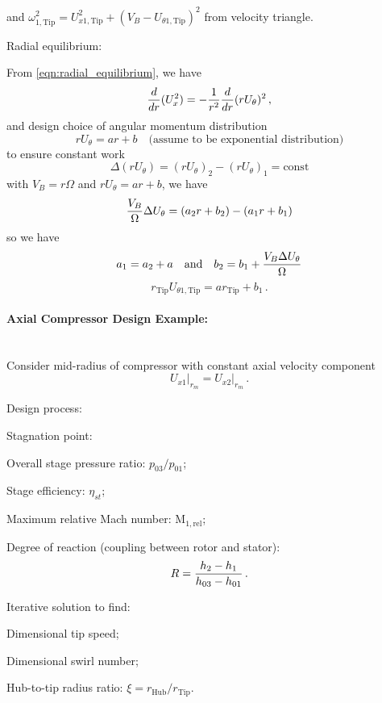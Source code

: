 \begin{enumeratePacked}
\begin{itemizePacked}
\[    \]
    and $\omega_{1,\text{Tip}}^2 = U_{x1,\text{Tip}}^2 + (V_B - U_{\theta1,\text{Tip}})^2$ from velocity triangle.
  \end{itemizePacked}
\item Radial equilibrium:
  \begin{itemizePacked}
  \item From \cref{eqn:radial_equilibrium}, we have
    \[
      {\frac{d}{dr}} (U_x^2) = - {\frac{1}{r^2}} {\frac{d}{dr}} (r U_\theta)^2\,,
    \]
    and design choice of angular momentum distribution
    \[
      r U_\theta = a r + b \quad \text{(assume to be exponential distribution)}
    \]
    to ensure constant work
    \[
      \Delta (r U_\theta) = (r U_\theta)_2 - (r U_\theta)_1 = \text{const}
    \]
    with $V_B = r \Omega$ and $r U_\theta = a r + b$, we have
    \[
      {\frac{V_B}{\Omega}} \Delta U_\theta = (a_2 r + b_2) - (a_1 r + b_1)
    \]
    so we have
    \[
      a_1 = a_2 + a \quad \text{and} \quad b_2 = b_1 + {\frac{V_B \Delta U_\theta}{\Omega}}
    \]
    \[
      r_\text{Tip} U_{\theta1, \text{Tip}} = a r_\text{Tip} + b_1\,.
    \]
  \end{itemizePacked}
\end{enumeratePacked}

\paragraph{Axial Compressor Design Example:}  \mbox{}\\[0.5em]

Consider mid-radius of compressor with constant axial velocity component
\[
  \left.U_{x1}\right|_{r_m} = \left.U_{x2}\right|_{r_m}\,.
\]

Design process:
\begin{itemizePacked}
\item Stagnation point:
  \begin{itemizePacked}
  \item Overall stage pressure ratio: $p_{03}/p_{01}$;
  \item Stage efficiency: $\eta_{st}$;
  \item Maximum relative Mach number: $\text{M}_{1,\text{rel}}$;
  \item Degree of reaction (coupling between rotor and stator):
    \[
      R = {\frac{h_2 - h_1}{h_{03} - h_{01}}} \,.
    \]
  \end{itemizePacked}
\item Iterative solution to find:
  \begin{itemizePacked}
  \item Dimensional tip speed;
  \item Dimensional swirl number;
  \item Hub-to-tip radius ratio: $\xi = r_\text{Hub}/r_\text{Tip}$.
  \end{itemizePacked}
\end{itemizePacked}

